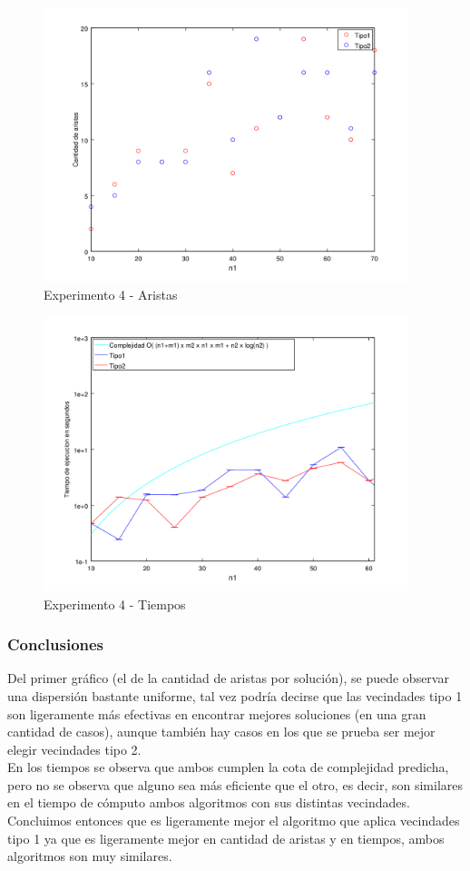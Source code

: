     \begin{figure}[H]
      \includegraphics[height=8cm]{graficos/ejercicio5-exp4aristas.png}
       \caption{Experimento 4 - Aristas}
	\end{figure}
    
        \begin{figure}[H]
      \includegraphics[height=8cm]{graficos/ejercicio5-exp4tiempos.png}
       \caption{Experimento 4 - Tiempos}
	\end{figure}
     	
\subsubsection*{Conclusiones}\;

 \noindent Del primer gráfico (el de la cantidad de aristas por solución), se puede observar una dispersión bastante uniforme, tal vez podría decirse que las vecindades tipo 1 son ligeramente más efectivas en encontrar mejores soluciones (en una gran cantidad de casos), aunque también hay casos en los que se prueba ser mejor elegir vecindades tipo 2.\\
    En los tiempos se observa que ambos cumplen la cota de complejidad predicha, pero no se observa que alguno sea más eficiente que el otro, es decir, son similares en el tiempo de cómputo ambos algoritmos con sus distintas vecindades.\\
    Concluimos entonces que es ligeramente mejor el algoritmo que aplica vecindades tipo 1 ya que es ligeramente mejor en cantidad de aristas y en tiempos, ambos algoritmos son muy similares.